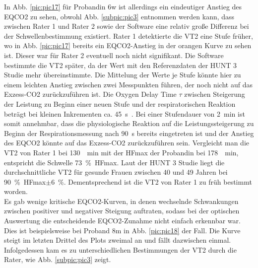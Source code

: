 In Abb. \ref{pic:pic17} für Probandin 6w ist allerdings ein eindeutiger Anstieg des \gls{EQCO2} zu sehen, obwohl Abb. \ref{subpic:pic3} entnommen werden kann, dass zwischen Rater 1 und Rater 2 sowie der Software eine relativ große Differenz bei der Schwellenbestimmung existiert. Rater 1 detektierte die VT2 eine Stufe früher, wo in Abb. \ref{pic:pic17} bereits ein \gls{EQCO2}-Anstieg in der orangen Kurve zu sehen ist. Dieser war für Rater 2 eventuell noch nicht signifikant. Die Software bestimmte die VT2 später, da der Wert mit den Referenzdaten der HUNT 3 Studie mehr übereinstimmte. Die Mittelung der Werte je Stufe könnte hier zu einem leichten Anstieg zwischen zwei Messpunkten führen, der noch nicht auf das Exzess-\gls{CO2} zurückzuführen ist. Die Oxygen Delay Time $\tau$ zwischen Steigerung der Leistung zu Beginn einer neuen Stufe und der respiratorischen Reaktion beträgt bei kleinen Inkrementen ca. \SI{45}{\second}~\cite{Kroidl.2015}. Bei einer Stufendauer von \SI{2}{\minute} ist somit annehmbar, dass die physiologische Reaktion auf die Leistungssteigerung zu Beginn der Respirationsmessung nach \SI{90}{\second} bereits eingetreten ist und der Anstieg des \gls{EQCO2} könnte auf das Exzess-\gls{CO2} zurückzuführen sein. Vergleicht man die VT2 von Rater 1 bei \SI{130}{\per\minute} mit der \gls{HFmax} der Probandin bei \SI{178}{\per\minute}, entspricht die Schwelle 73~\%~\gls{HFmax}. Laut der HUNT 3 Studie liegt die durchschnittliche VT2 für gesunde Frauen zwischen 40 und 49 Jahren bei 90~\%~\gls{HFmax}$\pm$6~\%. Dementsprechend ist die VT2 von Rater 1 zu früh bestimmt worden.\\
Es gab wenige kritische \gls{EQCO2}-Kurven, in denen wechselnde Schwankungen zwischen positiver und negativer Steigung auftraten, sodass bei der optischen Auswertung die entscheidende \gls{EQCO2}-Zunahme nicht einfach erkennbar war. Dies ist beispielsweise bei Proband 8m in Abb. \ref{pic:pic18} der Fall. Die Kurve steigt im letzten Drittel des Plots zweimal an und fällt dazwischen einmal. Infolgedessen kam es zu unterschiedlichen Bestimmungen der VT2 durch die Rater, wie Abb. \ref{subpic:pic3} zeigt.
%
